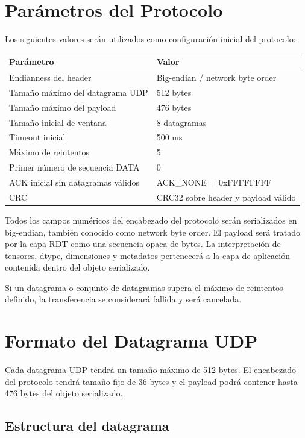 \documentclass[12pt]{article}
\begin{document}
\section{Parámetros del Protocolo}

Los siguientes valores serán utilizados como configuración inicial del protocolo:

\begin{table}[h]
\centering
\begin{tabular}{|l|l|}
\hline
Parámetro & Valor \\
\hline
Endianness del header & Big-endian / network byte order \\
\hline
Tamaño máximo del datagrama UDP & 512 bytes \\
\hline
Tamaño máximo del payload & 476 bytes \\
\hline
Tamaño inicial de ventana & 8 datagramas \\
\hline
Timeout inicial & 500 ms \\
\hline
Máximo de reintentos & 5 \\
\hline
Primer número de secuencia DATA & 0 \\
\hline
ACK inicial sin datagramas válidos & ACK\_NONE = 0xFFFFFFFF \\
\hline
CRC & CRC32 sobre header y payload válido \\
\hline
\end{tabular}
\end{table}

Todos los campos numéricos del encabezado del protocolo serán serializados en big-endian, también conocido como network byte order. El payload será tratado por la capa RDT como una secuencia opaca de bytes. La interpretación de tensores, dtype, dimensiones y metadatos pertenecerá a la capa de aplicación contenida dentro del objeto serializado.

Si un datagrama o conjunto de datagramas supera el máximo de reintentos definido, la transferencia se considerará fallida y será cancelada.

\section{Formato del Datagrama UDP}

Cada datagrama UDP tendrá un tamaño máximo de 512 bytes. El encabezado del protocolo tendrá tamaño fijo de 36 bytes y el payload podrá contener hasta 476 bytes del objeto serializado.

\subsection{Estructura del datagrama}
\end{document}
